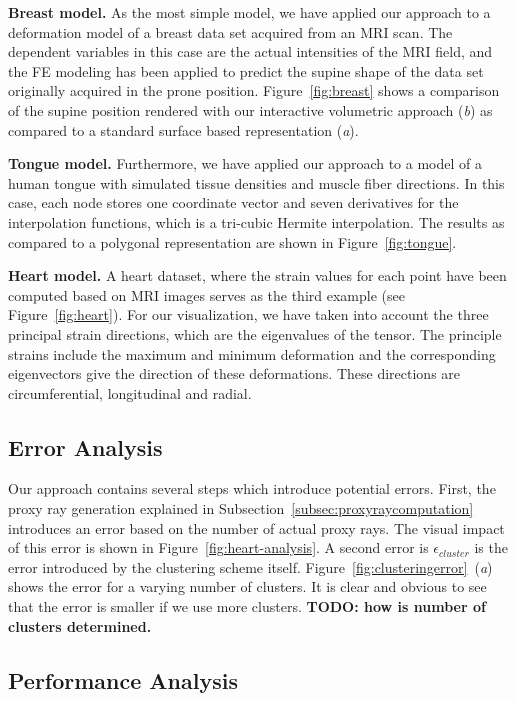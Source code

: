 \documentclass[review,journal]{vgtc}         %
\begin{document}
\noindent \textbf{Breast model.} As the most simple model, we have applied our approach to a deformation model of a breast data set acquired from an MRI scan. The dependent variables in this case are the actual intensities of the MRI field, and the FE modeling has been applied to predict the supine shape of the data set originally acquired in the prone position. Figure~\ref{fig:breast} shows a comparison of the supine position rendered with our interactive volumetric approach ({\it b}) as compared to a standard surface based representation ({\it a}).

\noindent \textbf{Tongue model.} Furthermore, we have applied our approach to a model of a human tongue with simulated tissue densities and muscle fiber directions. In this case, each node stores one coordinate vector and seven derivatives for the interpolation functions, which is a tri-cubic Hermite interpolation. The results as compared to a polygonal representation are shown in Figure~\ref{fig:tongue}.

\noindent \textbf{Heart model.} A heart dataset, where the strain values for each point have been computed based on MRI images serves as the third example (see Figure~\ref{fig:heart}). For our visualization, we have taken into account the three principal strain directions, which are the eigenvalues of the tensor. The principle strains include the maximum and minimum deformation and the corresponding eigenvectors give the direction of these deformations. These directions are circumferential, longitudinal and radial.


\subsection{Error Analysis}\label{subsec:error}
Our approach contains several steps which introduce potential errors. First, the proxy ray generation explained in Subsection~\ref{subsec:proxyraycomputation} introduces an error based on the number of actual proxy rays. The visual impact of this error is shown in Figure~\ref{fig:heart-analysis}. A second error is $\epsilon_{cluster}$ is the error introduced by the clustering scheme itself. Figure~\ref{fig:clusteringerror}~({\it a}) shows the error for a varying number of clusters. It is clear and obvious to see that the error is smaller if we use more clusters. \textbf{TODO: how is number of clusters determined.}


\subsection{Performance Analysis}\label{subsec:performance}
\end{document}
